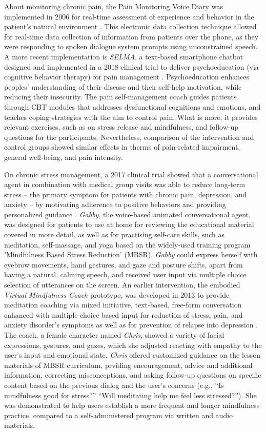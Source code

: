 About monitoring chronic pain, the Pain Monitoring Voice Diary was implemented in 2006 for real-time assessment of experience and behavior in the patient’s natural environment \cite{painmonitoring2006}. This electronic data collection technique allowed for real-time data collection of information from patients over the phone, as they were responding to spoken dialogue system prompts using unconstrained speech. A more recent implementation is \textit{SELMA}, a text-based smartphone chatbot designed and implemented in a 2018 clinical trial to deliver psychoeducation (via cognitive behavior therapy) for pain management \cite{selma2020}. Psychoeducation enhances peoples’ understanding of their disease and their self-help motivation, while reducing their insecurity. The pain self-management coach guides patients through CBT modules that addresses dysfunctional cognitions and emotions, and teaches coping strategies with the aim to control pain. What is more, it provides relevant exercises, such as on stress release and mindfulness, and follow-up questions for the participants. Nevertheless, comparison of the intervention and control groups showed similar effects in therms of pain-related impairment, general well-being, and pain intensity.

On chronic stress management, a 2017 clinical trial showed that a conversational agent in combination with medical group visits was able to reduce long-term stress -- the primary symptom for patients with chronic pain, depression, and anxiety -- by motivating adherence to positive behaviors and providing personalized guidance \cite{stress2017}. \textit{Gabby}, the voice-based animated conversational agent, was designed for patients to use at home for reviewing the educational material covered in more detail, as well as for practising self-care skills, such as meditation, self-massage, and yoga based on the widely-used training program 'Mindfulness Based Stress Reduction' (MBSR). \textit{Gabby} could express herself with eyebrow movements, hand gestures, and gaze and posture shifts, apart from having a natural, calming speech, and received user input via multiple choice selection of utterances on the screen. An earlier intervention, the embodied \textit{Virtual Mindfulness Coach} prototype, was developed in 2013 to provide meditation coaching via mixed initiative, text-based, free-form conversation enhanced with multiple-choice based input for reduction of stress, pain, and anxiety disorder's symptoms as well as for prevention of relapse into depression \cite{hudlicka2013}. The coach, a female character named \textit{Chris}, showed a variety of facial expressions, gestures, and gazes, which she adjusted reacting with empathy to the user's input and emotional state. \textit{Chris} offered customized guidance on the lesson materials of MBSR curriculum, prviding encouragement, advice and additional information, correcting misconceptions, and asking follow-up questions on specific content based on the previous dialog and the user's concerns (e.g., “Is mindfulness good for stress?” “Will meditating help me feel less stressed?”). She was demonstrated to help users establish a more frequent and longer mindfulness practice, compared to a self-administered program via written and audio materials.

